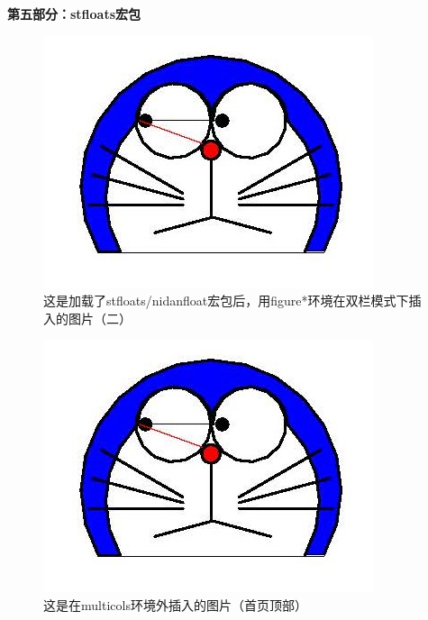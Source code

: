 ﻿\documentclass{article}
\begin{document}
    \textbf{第五部分：stfloats宏包}

    \blindtext[3]

    \begin{figure}[tbp]
        \includegraphics[width = .1\textwidth]{doraemon1.jpg}
        \caption{这是加载了stfloats/nidanfloat宏包后，用figure*环境在双栏模式下插入的图片（二）}
    \end{figure}
    
    \blindtext[3]

\onecolumn


        \begin{figure}[t]
            \includegraphics[width = .1\textwidth]{doraemon1.jpg}
            \caption{这是在multicols环境外插入的图片（首页顶部）}
        \end{figure}
\end{document}
